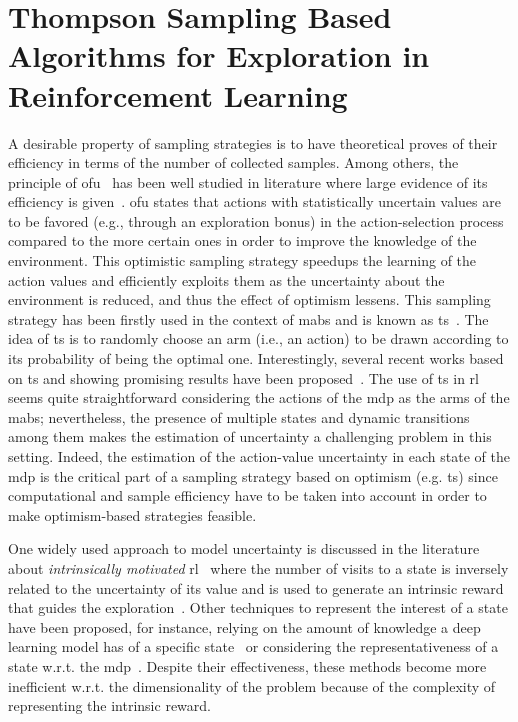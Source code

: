 \chapter{Thompson Sampling Based Algorithms for Exploration in Reinforcement Learning}\label{C:ts}
A desirable property of sampling strategies is to have theoretical proves of their efficiency in terms of the number of collected samples. Among others, the principle of \gls{ofu}~\cite{lai1985asymptotically} has been well studied in literature where large evidence of its efficiency is given~\cite{jaksch2010near, kakade2003sample, kearns2002near}. \gls{ofu} states that actions with statistically uncertain values are to be favored (e.g., through an exploration bonus) in the action-selection process compared to the more certain ones in order to improve the knowledge of the environment. This optimistic sampling strategy speedups the learning of the action values and efficiently exploits them as the uncertainty about the environment is reduced, and thus the effect of optimism lessens. This sampling strategy has been firstly used in the context of \glspl{mab} and is known as \gls{ts}~\cite{thompson1933likelihood}. The idea of \gls{ts} is to randomly choose an arm (i.e., an action) to be drawn according to its probability of being the optimal one. Interestingly, several recent works based on \gls{ts} and showing promising results have been proposed~\cite{chapelle2011empirical, granmo2010solving, may2011simulation, scott2010modern}. The use of \gls{ts} in \gls{rl} seems quite straightforward considering the actions of the \gls{mdp} as the arms of the \glspl{mab}; nevertheless, the presence of multiple states and dynamic transitions among them makes the estimation of uncertainty a challenging problem in this setting. Indeed, the estimation of the action-value uncertainty in each state of the \gls{mdp} is the critical part of a sampling strategy based on optimism (e.g. \gls{ts}) since computational and sample efficiency have to be taken into account in order to make optimism-based strategies feasible.

One widely used approach to model uncertainty is discussed in the literature about \textit{intrinsically motivated} \gls{rl}~\cite{chentanez2005intrinsically, schmidhuber1991possibility} where the number of visits to a state is inversely related to the uncertainty of its value and is used to generate an intrinsic reward that guides the exploration~\cite{bellemare2016unifying, tang2017exploration}. Other techniques to represent the interest of a state have been proposed, for instance, relying on the amount of knowledge a deep learning model has of a specific state~\cite{pathak2017curiosity} or considering the representativeness of a state w.r.t. the \gls{mdp}~\cite{bonarini2006self}. Despite their effectiveness, these methods become more inefficient w.r.t. the dimensionality of the problem because of the complexity of representing the intrinsic reward.

